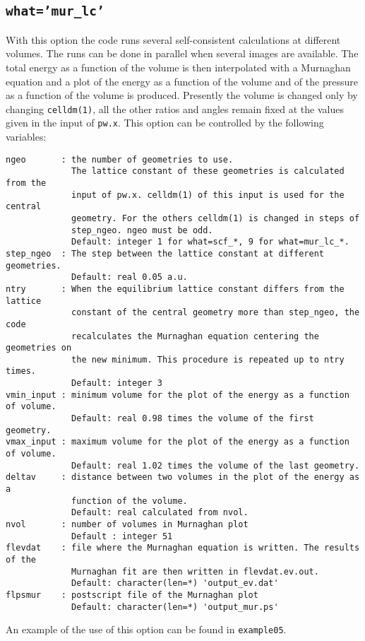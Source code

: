 \documentclass[12pt,a4paper]{article}
\begin{document}
\subsection{\texttt{what='mur\_lc'}}
With this option the code runs several self-consistent calculations
at different volumes. The runs can be done in parallel when several images 
are available. The total energy as a function of the volume is then 
interpolated with a Murnaghan equation and a plot of the energy
as a function of the volume and of the pressure as a function of the volume is
produced. Presently the volume is changed only by changing \texttt{celldm(1)},
all the other ratios and angles remain fixed at the values given in
the input of \texttt{pw.x}. 
This option can be controlled by the following variables:
\begin{verbatim}
ngeo       : the number of geometries to use.
             The lattice constant of these geometries is calculated from the
             input of pw.x. celldm(1) of this input is used for the central
             geometry. For the others celldm(1) is changed in steps of 
             step_ngeo. ngeo must be odd.
             Default: integer 1 for what=scf_*, 9 for what=mur_lc_*.
step_ngeo  : The step between the lattice constant at different geometries.
             Default: real 0.05 a.u.
ntry       : When the equilibrium lattice constant differs from the lattice 
             constant of the central geometry more than step_ngeo, the code 
             recalculates the Murnaghan equation centering the geometries on 
             the new minimum. This procedure is repeated up to ntry times.
             Default: integer 3
vmin_input : minimum volume for the plot of the energy as a function of volume.
             Default: real 0.98 times the volume of the first geometry.
vmax_input : maximum volume for the plot of the energy as a function of volume.
             Default: real 1.02 times the volume of the last geometry.
deltav     : distance between two volumes in the plot of the energy as a 
             function of the volume.
             Default: real calculated from nvol.
nvol       : number of volumes in Murnaghan plot
             Default : integer 51
flevdat    : file where the Murnaghan equation is written. The results of the
             Murnaghan fit are then written in flevdat.ev.out.
             Default: character(len=*) 'output_ev.dat'
flpsmur    : postscript file of the Murnaghan plot
             Default: character(len=*) 'output_mur.ps'
\end{verbatim}
An example of the use of this option can be found in \texttt{example05}.
\end{document}
